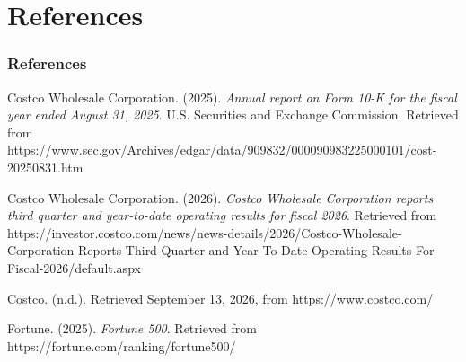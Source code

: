 \documentclass[11pt]{beamer}
\begin{document}
\section{References}
\begin{frame}[allowframebreaks]
\frametitle{References}
\small
Costco Wholesale Corporation. (2025). \textit{Annual report on Form 10-K for the fiscal year ended August 31, 2025}. U.S. Securities and Exchange Commission. Retrieved from https://www.sec.gov/Archives/edgar/data/909832/000090983225000101/cost-20250831.htm
\vspace{0.3cm}

Costco Wholesale Corporation. (2026). \textit{Costco Wholesale Corporation reports third quarter and year-to-date operating results for fiscal 2026}. Retrieved from https://investor.costco.com/news/news-details/2026/Costco-Wholesale-Corporation-Reports-Third-Quarter-and-Year-To-Date-Operating-Results-For-Fiscal-2026/default.aspx
\vspace{0.3cm}

Costco. (n.d.). Retrieved September 13, 2026, from https://www.costco.com/
\vspace{0.3cm}

Fortune. (2025). \textit{Fortune 500}. Retrieved from https://fortune.com/ranking/fortune500/
\end{frame}
\end{document}
